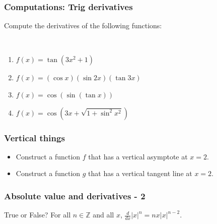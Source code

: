 \documentclass[14pt]{beamer}
\newcommand {\DS} [1] {${\displaystyle #1}$}
\newcommand {\Z}{\mathbb{Z}}
\newcommand{\azul}[1]{{\color{blue} #1}}
\newcommand{\rojo}[1]{{\color{red} #1}}
\begin{document}

\begin{frame}[t]
\frametitle{Computations: Trig derivatives}


Compute the derivatives of the following functions:

\
\begin{enumerate}
	\item  \DS{f(x) = \tan (3x^2+1)}

\vfill
	\item  \DS{f(x) = (\cos x )( \sin 2x )(\tan 3x)}

\vfill
	\item  \DS{f(x) = \cos ( \sin( \tan x))}
\vfill
	\item  \DS{f(x) = \cos \left( 3x + \sqrt{1 + \sin^2 x^2 } \right)}
\vfill
\end{enumerate}


\end{frame}




\begin{frame}[t]
\frametitle{Vertical things}

\begin{itemize}
	\item Construct a function $f$ that has a \rojo{vertical asymptote} at $x=2$.
	\item Construct a function $g$ that has a \azul{vertical tangent line} at $x=2$.
\end{itemize}

\end{frame}



\begin{frame}[t]
\frametitle{Absolute value and derivatives - 2}

\begin{block}{True or False?}
For all $n \in \Z$ and all $x$, $\frac{d}{dx}|x|^n=nx|x|^{n-2}$.

\end{block}
\end{frame}
\end{document}
